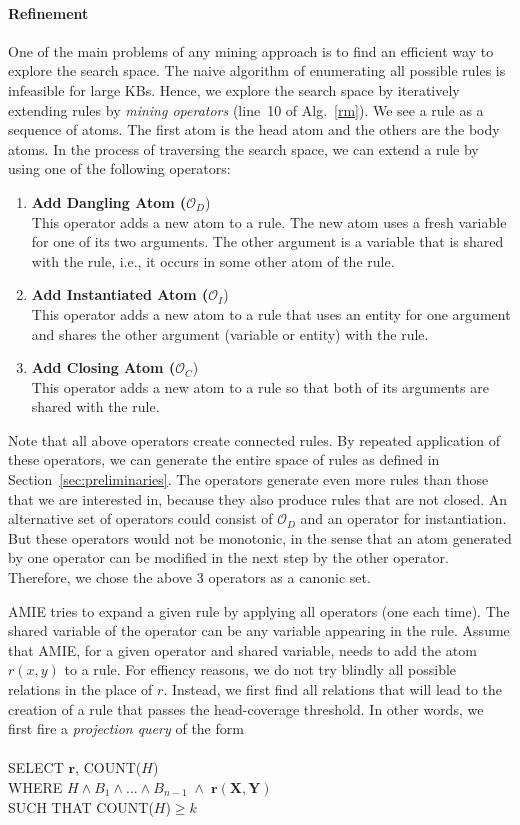 \paragraph{Refinement}\label{subsubsec:refinement}
One of the main problems of any mining approach is to find an efficient way to explore the search space. The naive algorithm of enumerating all possible rules is infeasible for large KBs.
Hence, we explore the search space by iteratively extending rules by \emph{mining operators} (line~10 of Alg.~\ref{rm}).
We see a rule as a sequence of atoms. The first atom is the head atom and the others are the body atoms. 
In the process of traversing the search space, we can extend a rule by using one of the following operators:
\begin{enumerate}
\item \textbf{Add Dangling Atom ($\mathcal{O}_D$})\\
This operator adds a new atom to a rule. The new atom uses a fresh variable for one of its two arguments. The other argument is a variable
that is shared with the rule, i.e., it occurs in some other atom of the rule.
\item \textbf{Add Instantiated Atom ($\mathcal{O}_I$})\\
This operator adds a new atom to a rule that uses an entity for one argument and shares the other argument (variable or entity) with the rule.
\item \textbf{Add Closing Atom ($\mathcal{O}_C$})\\
This operator adds a new atom to a rule so that both of its arguments are shared with the rule.
\end{enumerate}
Note that all above operators create connected rules.
By repeated application of these operators, we can generate the entire space of rules as defined in Section~\ref{sec:preliminaries}.
The operators generate even more rules than those that we are interested in, because they also produce rules that are not closed.
An alternative set of operators could consist of $\mathcal{O}_D$ and an operator for instantiation.
But these operators would not be monotonic, in the sense that an atom generated by one operator can be modified in the next step by the other operator.
Therefore, we chose the above 3 operators as a canonic set.


AMIE tries to expand a given rule by applying all operators (one each time). The shared variable of the operator can be any variable appearing in the rule.
Assume that AMIE, for a given operator and shared variable, needs to add the atom $r(x,y)$ to a rule. 
For effiency reasons, we do not try blindly all possible relations in the place of $r$. Instead, we first find all relations that will lead to the creation
of a rule that passes the head-coverage threshold.
In other words, we first fire a \emph{projection query} of the form
\\ \\
SELECT $\bm{r}$, COUNT($H$)\\
WHERE $H \wedge B_1 \wedge ... \wedge B_{n-1}\; \wedge\; \bm{r}(\bm{X},\bm{Y})$\\
SUCH THAT COUNT($H$)$\geq k$
\\ \\

